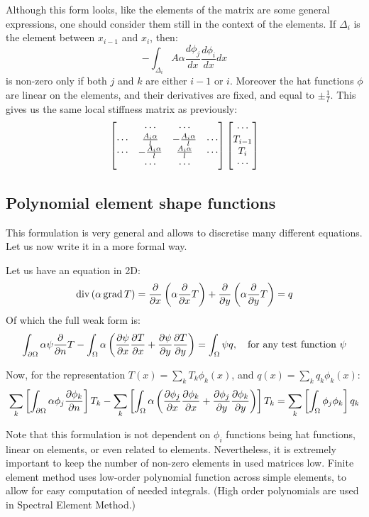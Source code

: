 \documentclass[12pt]{article}
\begin{document}
Although this form looks, like the elements of the matrix are some general expressions, one should consider them still in the context of the elements. If $\Delta_i$ is the element between $x_{i-1}$ and $x_i$, then:
\[-\int_{\Delta_i} A\alpha\frac{d\phi_j}{dx}\frac{d\phi_i}{dx}dx\]
is non-zero only if both $j$ and $k$ are either $i-1$ or $i$. Moreover the hat functions $\phi$ are linear on the elements, and their derivatives are fixed, and equal to $\pm\frac{1}{l}$. This gives us the same local stiffness matrix as previously:
\[\left[\begin{matrix} & \cdots & \cdots & \\
\cdots & \frac{A_i\alpha}{l} & -\frac{A_i\alpha}{l} & \cdots \\
\cdots & -\frac{A_i\alpha}{l} & \frac{A_i\alpha}{l} & \cdots \\
 & \cdots & \cdots & \end{matrix}\right]\left[\begin{matrix}\cdots\\T_{i-1}\\T_i\\\cdots\end{matrix}\right]\]

\subsection{Polynomial element shape functions}

This formulation is very general and allows to discretise many different equations. Let us now write it in a more formal way.

Let us have an equation in 2D:
\[\operatorname{div}{\left(\alpha\operatorname{grad}{T}\right)} = \frac{\partial}{\partial x}\left(\alpha\frac{\partial}{\partial x}T\right) + \frac{\partial}{\partial y}\left(\alpha\frac{\partial}{\partial y}T\right) = q\]
Of which the full weak form is:
\[\int_{\partial\Omega}\alpha\psi\frac{\partial}{\partial n}T-\int_\Omega\alpha\left(\frac{\partial \psi}{\partial x}\frac{\partial T}{\partial x} + \frac{\partial \psi}{\partial y}\frac{\partial T}{\partial y}\right) = \int_\Omega\psi q,\quad\text{for any test function }\psi\]

Now, for the representation $T(x)=\sum_k T_k\phi_k(x)$, and $q(x)=\sum_k q_k\phi_k(x)$:
\[\sum_k\left[\int_{\partial\Omega}\alpha\phi_j\frac{\partial \phi_k}{\partial n}\right]T_k-\sum_k\left[\int_\Omega\alpha\left(\frac{\partial \phi_j}{\partial x}\frac{\partial \phi_k}{\partial x} + \frac{\partial \phi_j}{\partial y}\frac{\partial \phi_k}{\partial y}\right)\right]T_k = \sum_k\left[\int_\Omega\phi_j\phi_k\right]q_k\]

Note that this formulation is not dependent on $\phi_i$ functions being hat functions, linear on elements, or even related to elements. Nevertheless, it is extremely important to keep the number of non-zero elements in used matrices low. Finite element method uses low-order polynomial function across simple elements, to allow for easy computation of needed integrals. (High order polynomials are used in Spectral Element Method.)
\end{document}
